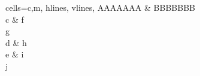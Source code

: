 \documentclass{ctexrep}%
\begin{document}
\begin{tblr}{
		cells={c,m},
		hlines,
		vlines,
	}
	AAAAAAA & BBBBBBB \\
	c       & {f      \\g} \\ %
	d       & h       \\
	e       & {i      \\j}    %
\end{tblr}
\end{document}
